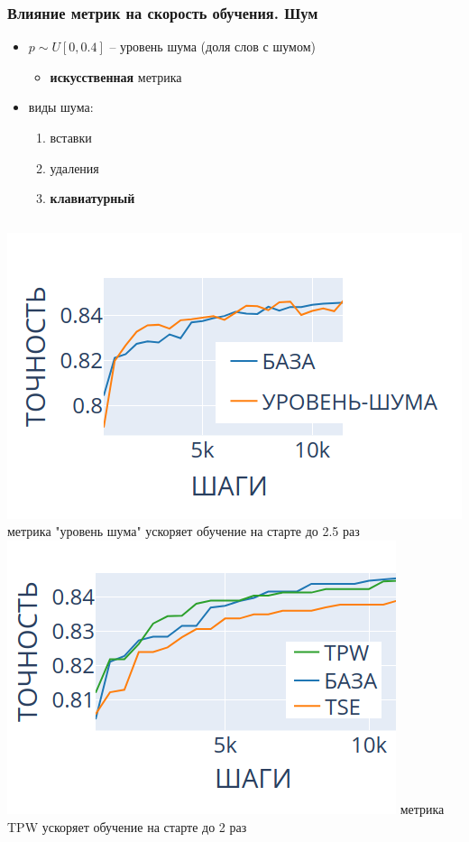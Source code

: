 \documentclass{beamer}
\begin{document}
\begin{frame}
	\frametitle{Влияние метрик на скорость обучения. Шум}
	\begin{itemize}
		\item $p \sim U[0, 0.4]$ -- уровень шума (доля слов с шумом)
			\begin{itemize}
				\item {\bf искусственная} метрика
			\end{itemize}
		\item виды шума:
			\begin{enumerate}
				\item вставки
				\item удаления
				\item {\bf клавиатурный}
			\end{enumerate}
	\end{itemize}
	\begin{columns}
		\includegraphics[scale=0.48]{keyboard_noise_level_short_prefix}
		метрика "уровень шума" ускоряет обучение на старте до 2.5 раз
		\includegraphics[scale=0.5]{keyboard_noise_TPW_win}
		метрика TPW ускоряет обучение на старте до 2 раз
	\end{columns}
\end{frame}
\end{document}
